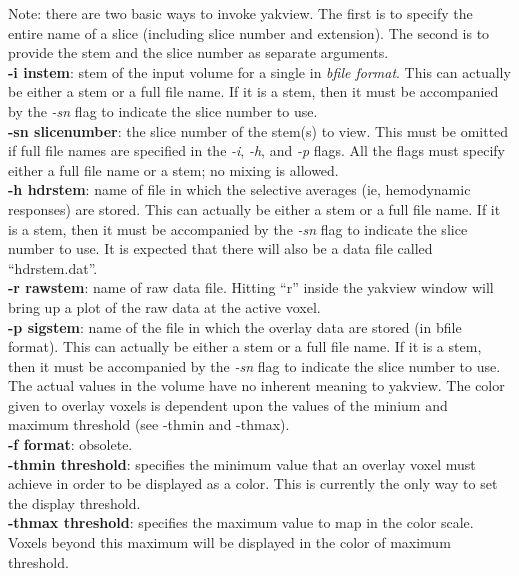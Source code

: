 \documentclass[10pt]{article}
\begin{document}
Note: there are two basic ways to invoke yakview.  The first is to
specify the entire name of a slice (including slice number and
extension). The second is to provide the stem and the slice number as
separate arguments.\\

\noindent
{\bf -i instem}: stem of the input volume for a single in {\em bfile format}. 
This can actually be either a stem or a full file name.  If it is a
stem, then it must be accompanied by the {\em -sn } flag to indicate
the slice number to use.\\

\noindent
{\bf -sn slicenumber}: the slice number of the stem(s) to view.  This
must be omitted if full file names are specified in the {\em -i}, {\em
-h}, and {\em -p} flags.  All the flags must specify either a full
file name or a stem; no mixing is allowed.\\

\noindent
{\bf -h hdrstem}: name of file in which the selective averages (ie,
hemodynamic responses) are stored.  This can actually be either a stem
or a full file name.  If it is a stem, then it must be accompanied by
the {\em -sn } flag to indicate the slice number to use. It is
expected that there will also be a data file called
``hdrstem.dat''. \\

\noindent
{\bf -r rawstem}: name of raw data file.  Hitting ``r'' inside the
yakview window will bring up a plot of the raw data at the active
voxel. \\

\noindent
{\bf -p sigstem}: name of the file in which the overlay data are
stored (in bfile format). This can actually be either a stem or a full
file name.  If it is a stem, then it must be accompanied by the {\em
-sn } flag to indicate the slice number to use.  The actual values in
the volume have no inherent meaning to yakview.  The color given to
overlay voxels is dependent upon the values of the minium and maximum
threshold (see -thmin and -thmax).  \\

\noindent
{\bf -f format}: obsolete.\\

\noindent
{\bf -thmin threshold}: specifies the minimum value that an overlay
voxel must achieve in order to be displayed as a color. This
is currently the only way to set the display threshold.\\

\noindent
{\bf -thmax threshold}: specifies the maximum value to map in the
color scale.  Voxels beyond this maximum will be displayed in the
color of maximum threshold.\\
\end{document}
